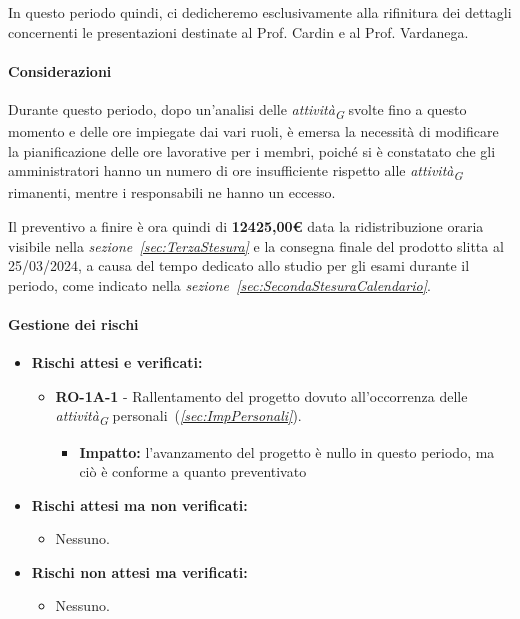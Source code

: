 \vspace{0.2cm}

In questo periodo quindi, ci dedicheremo esclusivamente alla rifinitura dei dettagli concernenti le presentazioni destinate al Prof. Cardin e al Prof. Vardanega.

\paragraph{Considerazioni}
Durante questo periodo, dopo un'analisi delle \textit{attività}\textsubscript{\textit{G}} svolte fino a questo momento e delle ore impiegate dai vari ruoli, è emersa la necessità di modificare la pianificazione delle ore lavorative per i membri, poiché si è constatato che gli amministratori hanno un numero di ore insufficiente rispetto alle \textit{attività}\textsubscript{\textit{G}} rimanenti, mentre i responsabili ne hanno un eccesso.

\vspace{0.2cm}

Il preventivo a finire è ora quindi di \textbf{12425,00€} data la ridistribuzione oraria visibile nella \textit{sezione~\ref{sec:TerzaStesura}} e la consegna finale del prodotto slitta al 25/03/2024, a causa del tempo dedicato allo studio per gli esami durante il periodo, come indicato nella \textit{sezione~\ref{sec:SecondaStesuraCalendario}}. 


\paragraph{Gestione dei rischi} 
\begin{itemize}
    \item \textbf{Rischi attesi e verificati:}
\begin{itemize}
    \item \textbf{RO-1A-1} - Rallentamento del progetto dovuto all'occorrenza delle \textit{attività}\textsubscript{\textit{G}} personali~(\textit{\ref{sec:ImpPersonali}}).
    \begin{itemize}
        \item \textbf{Impatto:}
       l'avanzamento del progetto è nullo in questo periodo, ma ciò è conforme a quanto preventivato
    \end{itemize}
\end{itemize}
\item \textbf{Rischi attesi ma non verificati:}
    \begin{itemize}
        \item Nessuno.
    \end{itemize}
    \item \textbf{Rischi non attesi ma verificati:}
    \begin{itemize}
        \item Nessuno.
    \end{itemize}
\end{itemize}
\newpage
